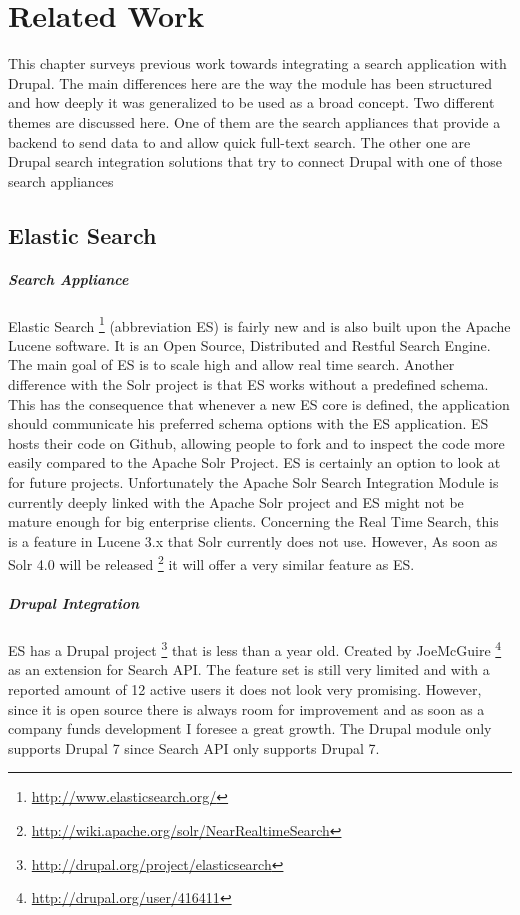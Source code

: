 \chapter{Related Work}
This chapter surveys previous work towards integrating a search application with Drupal. The main differences here are the way the module has been structured and how deeply it was generalized to be used as a broad concept. Two different themes are discussed here. One of them are the search appliances that provide a backend to send data to and allow quick full-text search. The other one are Drupal search integration solutions that try to connect Drupal with one of those search appliances

\section{Elastic Search}
\paragraph{Search Appliance}
Elastic Search \footnote{\url{http://www.elasticsearch.org/}} (abbreviation ES) is fairly new and is also built upon the Apache Lucene software. It is an Open Source, Distributed and Restful Search Engine. The main goal of ES is to scale high and allow real time search. Another difference with the Solr project is that ES works without a predefined schema. This has the consequence that whenever a new ES core is defined, the application should communicate his preferred schema options with the ES application. 
ES hosts their code on Github, allowing people to fork and to inspect the code more easily compared to the Apache Solr Project. 
ES is certainly an option to look at for future projects. Unfortunately the Apache Solr Search Integration Module is currently deeply linked with the Apache Solr project and ES might not be mature enough for big enterprise clients. Concerning the Real Time Search, this is a feature in Lucene 3.x that Solr currently does not use. However, As soon as Solr 4.0 will be released \footnote{\url{http://wiki.apache.org/solr/NearRealtimeSearch}} it will offer a very similar feature as ES. 

\paragraph{Drupal Integration}
ES has a Drupal project \footnote{\url{http://drupal.org/project/elasticsearch}} that is less than a year old. Created by JoeMcGuire \footnote{\url{http://drupal.org/user/416411}} as an extension for Search API. The feature set is still very limited and with a reported amount of 12 active users it does not look very promising. However, since it is open source there is always room for improvement and as soon as a company funds development I foresee a great growth. The Drupal module only supports Drupal 7 since Search API only supports Drupal 7.


